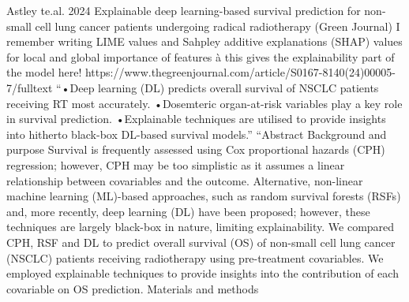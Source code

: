 \documentclass{article}%
\begin{document}
%
Astley te.al. 2024 Explainable deep learning{-}based survival prediction for non{-}small cell lung cancer patients undergoing radical radiotherapy (Green Journal) %
\newline%
\newline%
%
I remember writing LIME values and Sahpley additive explanations (SHAP) values for local and global importance of features à this gives the explainability part of the model here! %
\newline%
\newline%
%
https://www.thegreenjournal.com/article/S0167{-}8140(24)00005{-}7/fulltext%
\newline%
\newline%
%
“•Deep learning (DL) predicts overall survival of NSCLC patients receiving RT most accurately.%
\newline%
\newline%
%
%
\newline%
\newline%
%
•Dosemteric organ{-}at{-}risk variables play a key role in survival prediction.%
\newline%
\newline%
%
•Explainable techniques are utilised to provide insights into hitherto black{-}box DL{-}based survival models.” %
\newline%
\newline%
%
“Abstract%
\newline%
\newline%
%
Background and purpose%
\newline%
\newline%
%
Survival is frequently assessed using Cox proportional hazards (CPH) regression; however, CPH may be too simplistic as it assumes a linear relationship between covariables and the outcome. Alternative, non{-}linear machine learning (ML){-}based approaches, such as random survival forests (RSFs) and, more recently, deep learning (DL) have been proposed; however, these techniques are largely black{-}box in nature, limiting explainability. We compared CPH, RSF and DL to predict overall survival (OS) of non{-}small cell lung cancer (NSCLC) patients receiving radiotherapy using pre{-}treatment covariables. We employed explainable techniques to provide insights into the contribution of each covariable on OS prediction.%
\newline%
\newline%
%
Materials and methods%
\newline%
\newline%
\end{document}
